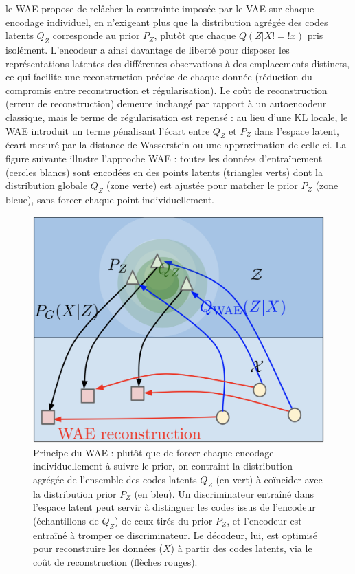 le WAE propose de relâcher la contrainte imposée par le VAE sur chaque encodage individuel, en n’exigeant plus que la distribution agrégée des codes latents $Q_Z$ corresponde au prior $P_Z$, plutôt que chaque $Q(Z|X!=!x)$ pris isolément. L’encodeur a ainsi davantage de liberté pour disposer les représentations latentes des différentes observations à des emplacements distincts, ce qui facilite une reconstruction précise de chaque donnée (réduction du compromis entre reconstruction et régularisation). Le coût de reconstruction (erreur de reconstruction) demeure inchangé par rapport à un autoencodeur classique, mais le terme de régularisation est repensé : au lieu d’une KL locale, le WAE introduit un terme pénalisant l’écart entre $Q_Z$ et $P_Z$ dans l’espace latent, écart mesuré par la distance de Wasserstein ou une approximation de celle-ci. La figure suivante illustre l’approche WAE : toutes les données d’entraînement (cercles blancs) sont encodées en des points latents (triangles verts) dont la distribution globale $Q_Z$ (zone verte) est ajustée pour matcher le prior $P_Z$ (zone bleue), sans forcer chaque point individuellement.

\begin{figure}[H]
    \centering
    \includegraphics[width=0.7\linewidth]{images/wae.png}
    \caption{\justifying Principe du WAE : plutôt que de forcer chaque encodage individuellement à suivre le prior, on contraint la distribution agrégée de l’ensemble des codes latents $Q_Z$ (en vert) à coïncider avec la distribution prior $P_Z$ (en bleu). Un discriminateur entraîné dans l’espace latent peut servir à distinguer les codes issus de l’encodeur (échantillons de $Q_Z$) de ceux tirés du prior $P_Z$, et l’encodeur est entraîné à tromper ce discriminateur. Le décodeur, lui, est optimisé pour reconstruire les données ($X$) à partir des codes latents, via le coût de reconstruction (flèches rouges).}
    \label{fig:enter-label}
\end{figure}

